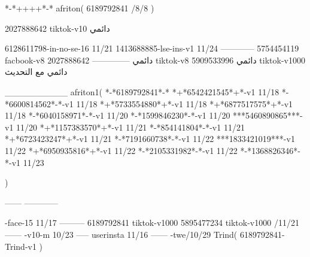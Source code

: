 *-*++++*-*
afriton(
6189792841 /8/8
)

2027888642 tiktok-v10
دائمي

6128611798-in-no-se-16 11/21
1413688885-lse-ins-v1 11/24
------------
5754454119 facbook-v8
دائمي
--------------
2027888642 tiktok-v8
دائمي
5909533996 tiktok-v1000
دائمي مع التحديث

__________
afriton1(
*-*6189792841*-*
*+*6542421545*+*-v1 11/18
*-*6600814562*-*-v1 11/18
*+*5733554880*+*-v1 11/18
*+*6877517575*+*-v1 11/18
*-*6040158971*-*-v1 11/20
*-*1599846230*-*-v1 11/20
***5460890865***-v1 11/20
*+*1157383570*+*-v1 11/21
*-*854141804*-*-v1 11/21
*+*6723423247*+*-v1 11/21
*-*7191660738*-*-v1 11/22
***1833421019***-v1 11/22
*+*6950935816*+*-v1 11/22
*-*2105331982*-*-v1 11/22
*-*1368826346*-*-v1 11/23

)

------
------------

-face-15 11/17
---------
6189792841 tiktok-v1000
5895477234 tiktok-v1000 /11/21
------
-v10-m 10/23
-----
userinsta 11/16
------
-twe/10/29
Trind(
6189792841-Trind-v1 
)
